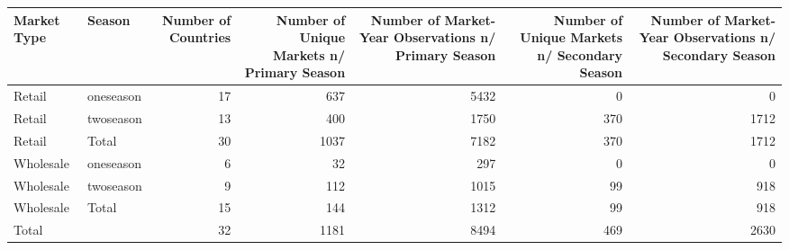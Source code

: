 \begin{table}[ht]
\centering
\begin{tabular}{llrrrrr}
  \hline
Market Type & Season & Number of Countries & Number of Unique Markets n/ Primary Season & Number of Market-Year Observations n/ Primary Season & Number of Unique Markets n/ Secondary Season & Number of Market-Year Observations n/ Secondary Season \\ 
  \hline
Retail & oneseason &  17 & 637 & 5432 &   0 &   0 \\ 
  Retail & twoseason &  13 & 400 & 1750 & 370 & 1712 \\ 
  Retail & Total &  30 & 1037 & 7182 & 370 & 1712 \\ 
  Wholesale & oneseason &   6 &  32 & 297 &   0 &   0 \\ 
  Wholesale & twoseason &   9 & 112 & 1015 &  99 & 918 \\ 
  Wholesale & Total &  15 & 144 & 1312 &  99 & 918 \\ 
  Total &  &  32 & 1181 & 8494 & 469 & 2630 \\ 
   \hline
\end{tabular}
\end{table}
